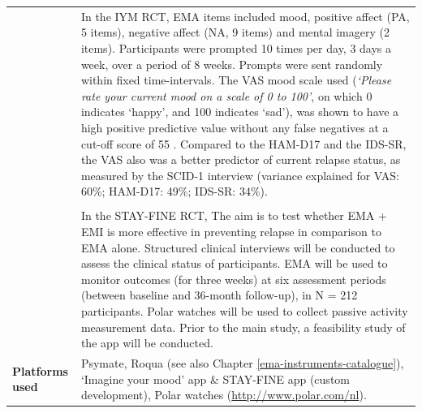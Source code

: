 \documentclass[]{book}
\begin{document}
\begin{longtable}[]{@{}ll@{}}
\begin{minipage}[t]{0.25\columnwidth}
\end{minipage} & \begin{minipage}[t]{0.69\columnwidth}\raggedright\strut
In the IYM RCT, EMA items included mood, positive affect (PA, 5 items),
negative affect (NA, 9 items) and mental imagery (2 items). Participants
were prompted 10 times per day, 3 days a week, over a period of 8 weeks.
Prompts were sent randomly within fixed time-intervals. The VAS mood
scale used (\emph{`Please rate your current mood on a scale of 0 to
100'}, on which 0 indicates `happy', and 100 indicates `sad'), was shown
to have a high positive predictive value without any false negatives at
a cut-off score of 55 \citep{Vanrijsbergen2014}. Compared to the HAM-D17
and the IDS-SR, the VAS also was a better predictor of current relapse
status, as measured by the SCID-1 interview (variance explained for VAS:
60\%; HAM-D17: 49\%; IDS-SR: 34\%).\strut
\end{minipage}\tabularnewline
\begin{minipage}[t]{0.25\columnwidth}\raggedright\strut
\strut
\end{minipage} & \begin{minipage}[t]{0.69\columnwidth}\raggedright\strut
\strut
\end{minipage}\tabularnewline
\begin{minipage}[t]{0.25\columnwidth}\raggedright\strut
\strut
\end{minipage} & \begin{minipage}[t]{0.69\columnwidth}\raggedright\strut
In the STAY-FINE RCT, The aim is to test whether EMA + EMI is more
effective in preventing relapse in comparison to EMA alone. Structured
clinical interviews will be conducted to assess the clinical status of
participants. EMA will be used to monitor outcomes (for three weeks) at
six assessment periods (between baseline and 36-month follow-up), in N =
212 participants. Polar watches will be used to collect passive activity
measurement data. Prior to the main study, a feasibility study of the
app will be conducted.\strut
\end{minipage}\tabularnewline
\begin{minipage}[t]{0.25\columnwidth}\raggedright\strut
\textbf{Platforms used}\strut
\end{minipage} & \begin{minipage}[t]{0.69\columnwidth}\raggedright\strut
Psymate, Roqua (see also Chapter \ref{ema-instruments-catalogue}),
`Imagine your mood' app \& STAY-FINE app (custom development), Polar
watches (\url{http://www.polar.com/nl}).\strut

\end{minipage}
\end{longtable}
\end{document}
